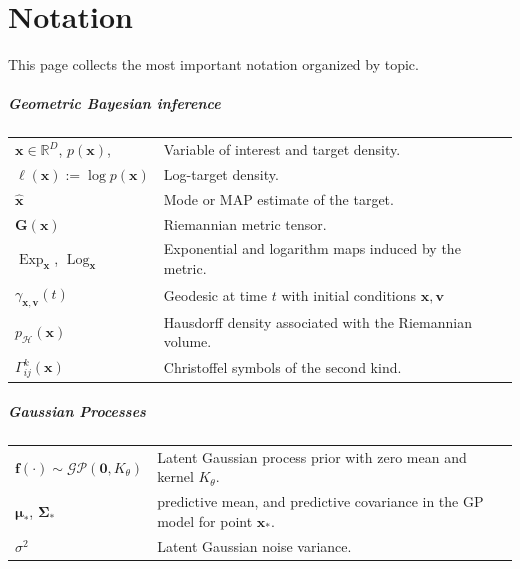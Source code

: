 \chapter*{Notation}
This page collects the most important notation organized by topic. 

\paragraph{Geometric Bayesian inference}
\begin{center}
\renewcommand{\arraystretch}{1.15}
\begin{tabular}{p{}p{}}
$\boldsymbol{x}\in\mathbb{R}^{D}$, $p(\boldsymbol{x})$,  & Variable of interest and target density. \\
$\ell(\boldsymbol{x}):=\log p(\boldsymbol{x})$ & Log-target density.\\
$\hat{\boldsymbol{x}}$ & Mode or MAP estimate of the target. \\
$\mathbf{G}(\boldsymbol{x})$ & Riemannian metric tensor. \\
$\operatorname{Exp}_{\boldsymbol{x}}$, $\operatorname{Log}_{\boldsymbol{x}}$ & Exponential and logarithm maps induced by the metric. \\
$\gamma_{\boldsymbol{x}, \boldsymbol{v}}(t)$ & Geodesic at time $t$ with initial conditions $\boldsymbol{x}, \boldsymbol{v}$ \\
$p_{\mathcal{H}}(\boldsymbol{x})$ & Hausdorff density associated with the Riemannian volume. \\
$\Gamma^k_{ij}(\boldsymbol{x})$ & Christoffel symbols of the second kind. \\
\end{tabular}
\end{center}

\paragraph{Gaussian Processes}
\begin{center}
\renewcommand{\arraystretch}{1.15}
\begin{tabular}{p{}p{}}
$\mathbf{f}(\cdot)\sim\mathcal{GP}(\mathbf{0},K_{\theta})$ & Latent Gaussian process prior with zero mean and kernel $K_{\theta}$. \\
$\boldsymbol{\mu}_*$, $\boldsymbol{\Sigma}_*$ &  predictive mean, and predictive covariance in the GP model for point $\boldsymbol{x}_*$. \\
$\sigma^2$ & Latent Gaussian noise variance. \\
\end{tabular}
\end{center}

